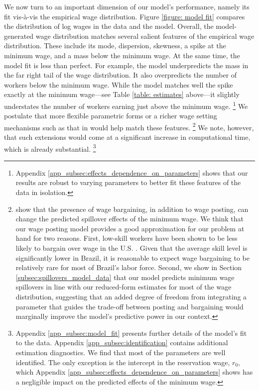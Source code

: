 We now turn to an important dimension of our model's performance, namely its fit vis-{\`{a}}-vis the empirical wage distribution. Figure \ref{figure: model fit} compares the distribution of log wages in the data and the model. Overall, the model-generated wage distribution matches several salient features of the empirical wage distribution. These include its mode, dispersion, skewness, a spike at the minimum wage, and a mass below the minimum wage. At the same time, the model fit is less than perfect. For example, the model underpredicts the mass in the far right tail of the wage distribution. It also overpredicts the number of workers below the minimum wage. While the model matches well the spike exactly at the minimum wage---see Table \ref{table: estimates} above---it slightly understates the number of workers earning just above the minimum wage.%
%
\footnote{Appendix \ref{app_subsec:effects_dependence_on_parameters} shows that our results are robust to varying parameters to better fit these features of the data in isolation.} %
%
We postulate that more flexible parametric forms or a richer wage setting mechanisms such as that in \citet{FlinnMullins2018} would help match these features.%
%
\footnote{\citet{FlinnMullins2018} show that the presence of wage bargaining, in addition to wage posting, can change the predicted spillover effects of the minimum wage. We think that our wage posting model provides a good approximation for our problem at hand for two reasons. First, low-skill workers have been shown to be less likely to bargain over wage in the U.S. \citep{Hall2012}. Given that the average skill level is significantly lower in Brazil, it is reasonable to expect wage bargaining to be relatively rare for most of Brazil's labor force. Second, we show in Section \ref{subsec:spillovers_model_data} that our model predicts minimum wage spillovers in line with our reduced-form estimates for most of the wage distribution, suggesting that an added degree of freedom from integrating a parameter that guides the trade-off between posting and bargaining would marginally improve the model's predictive power in our context.} %
%
We note, however, that such extensions would come at a significant increase in computational time, which is already substantial.%
%
\footnote{Appendix \ref{app_subsec:model_fit} presents further details of the model's fit to the data. Appendix \ref{app_subsec:identification} contains additional estimation diagnostics. We find that most of the parameters are well identified. The only exception is the intercept in the reservation wage, $r_0$, which Appendix \ref{app_subsec:effects_dependence_on_parameters} shows has a negligible impact on the predicted effects of the minimum wage.} %
%

